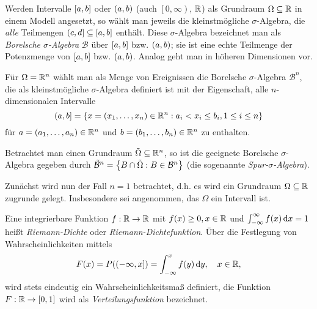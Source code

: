 \documentclass{lecture}
\begin{document}
    \begin{definition}
        Werden Intervalle \(\brackets*{a, b}\) oder \(\parentheses*{a, b}\) (auch \(\left[0, \infty\right)\), \(\R\)) als Grundraum \(\Omega \subseteq \R\) in einem Modell angesetzt, so wählt man jeweils die kleinstmögliche \(\sigma\)-Algebra, die \emph{alle} Teilmengen \(\left(c, d\right] \subseteq \brackets*{a, b}\) enthält.
        Diese \(\sigma\)-Algebra bezeichnet man als \emph{Borelsche \(\sigma\)-Algebra} \(\mathcal{B}\) über \(\brackets*{a, b}\) bzw. \(\parentheses*{a, b}\); sie ist eine echte Teilmenge der Potenzmenge von \(\brackets*{a, b}\) bzw. \(\parentheses*{a, b}\).
        Analog geht man in höheren Dimensionen vor.

        Für \(\Omega = \R^n\) wählt man als Menge von Ereignissen die Borelsche \(\sigma\)-Algebra \(\mathcal{B}^n\), die als kleinstmögliche \(\sigma\)-Algebra definiert ist mit der Eigenschaft, alle \(n\)-dimensionalen Intervalle
        \[
            \left(a, b\right] = \braces*{x = \parentheses*{x_1, \ldots, x_n} \in \R^n : a_i < x_i \le b_i, 1 \le i \le n}
        \]
        für \(a = \parentheses*{a_1, \ldots, a_n} \in \R^n\) und \(b = \parentheses*{b_1, \ldots, b_n} \in \R^n\) zu enthalten.

        Betrachtet man einen Grundraum \(\tilde{\Omega} \subseteq \R^n\), so ist die geeignete Borelsche \(\sigma\)-Algebra gegeben durch \(\tilde{\mathcal{B}}^n = \braces*{B \cap \tilde{\Omega} : B \in \mathcal{B}^n}\) (die sogenannte \emph{Spur-\(\sigma\)-Algebra}).
    \end{definition}

    Zunächst wird nun der Fall \(n = 1\) betrachtet, d.h. es wird ein Grundraum \(\Omega \subseteq \R\) zugrunde gelegt.
    Insbesondere sei angenommen, das \(\Omega\) ein Intervall ist.

    \begin{definition}
        Eine integrierbare Funktion \(f: \R \to \R\) mit \(f\parentheses*{x} \ge 0, x \in \R\) und \(\int_{-\infty}^\infty f\parentheses*{x}\d x = 1\) heißt \emph{Riemann-Dichte} oder \emph{Riemann-Dichtefunktion}.
        Über die Festlegung von Wahrscheinlichkeiten mittels
        \[
            F\parentheses*{x} = P\parentheses*{\left(-\infty, x\right]} = \int_{-\infty}^x f\parentheses*{y}\d y, \quad x \in \R,
        \]
        wird stets eindeutig ein Wahrscheinlichkeitsmaß definiert, die Funktion \(F: \R \to \brackets*{0, 1}\) wird als \emph{Verteilungsfunktion} bezeichnet.
    \end{definition}
\end{document}
